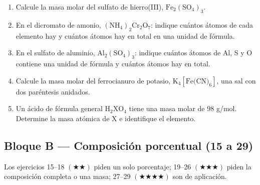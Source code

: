 \documentclass[12pt, letterpaper]{article}
\begin{document}
\begin{enumerate}[leftmargin=*, start=1]
  \item \medio{}\hspace{0.55em}Calcule la masa molar del sulfato de hierro(III), $\text{Fe}_2(\text{SO}_4)_3$.

  \item \medio{}\hspace{0.55em}En el dicromato de amonio, $(\text{NH}_4)_2\text{Cr}_2\text{O}_7$: indique cuántos átomos de cada elemento hay y cuántos átomos hay en total en una unidad de fórmula.

  \item \medio{}\hspace{0.55em}En el sulfato de aluminio, $\text{Al}_2(\text{SO}_4)_3$: indique cuántos átomos de Al, S y O contiene una unidad de fórmula y cuántos átomos hay en total.

  \item \dificil{}\hspace{0.55em}Calcule la masa molar del ferrocianuro de potasio, $\text{K}_4[\text{Fe(CN)}_6]$, una sal con dos paréntesis anidados.

  \item \dificil{}\hspace{0.55em}Un ácido de fórmula general $\text{H}_2\text{XO}_4$ tiene una masa molar de $98$ g/mol. Determine la masa atómica de $\text{X}$ e identifique el elemento.

\end{enumerate}

\subsection{Bloque B — Composición porcentual (15 a 29)}

\noindent Los ejercicios 15--18 $(\bigstar\bigstar)$ piden un solo porcentaje; 19--26 $(\bigstar\bigstar\bigstar)$ piden la composición completa o una masa; 27--29 $(\bigstar\bigstar\bigstar\bigstar)$ son de aplicación.
\end{document}
